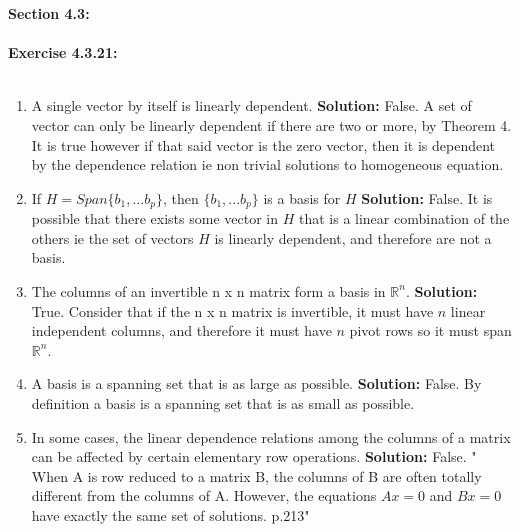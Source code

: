 \documentclass{amsart}
\def\RR{{\mathbb R}}
\begin{document}
{\huge\textbf{Section 4.3:}}\\\\
\noindent\textbf{Exercise 4.3.21: } \\\\
\begin{enumerate}


\item A single vector by itself is linearly dependent.
\noindent \textbf{Solution: } False. A set of vector can only be linearly dependent if there are two or more, by Theorem 4. It is true however if that said vector is the zero vector, then it is dependent by the dependence relation ie non trivial solutions to homogeneous equation.
\vspace{1in}



\item If $H = Span\{b_1,...b_p\}$, then $\{b_1,...b_p\}$ is a basis for $H$
\noindent \textbf{Solution: } False. It is possible that there exists some vector in $H$ that is a linear combination of the others ie the set of vectors $H$ is linearly dependent, and therefore are not a basis. 
\vspace{1in}



\item The columns of an invertible n x n matrix form a basis in $\RR^n$.
\noindent \textbf{Solution: } True. Consider that if the n x n matrix is invertible, it must have $n$ linear independent columns, and therefore it must have $n$ pivot rows so it must span $\RR^n$.
\vspace{1in}


\item A basis is a spanning set that is as large as possible. 
\noindent \textbf{Solution: } False. By definition a basis is a spanning set that is as small as possible.
\vspace{1in}





\item In some cases, the linear dependence relations among the columns of a matrix can be affected by certain elementary row operations.
\noindent \textbf{Solution: } False. " When A is row reduced to a matrix B, the columns of B are often totally different from the columns of A. However, the equations  $Ax = 0$ and $Bx = 0$ have exactly the same set of solutions. p.213"
\vspace{1in}




\end{enumerate}
\end{document}
